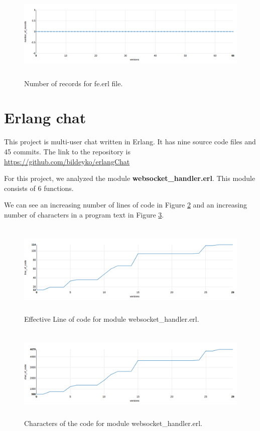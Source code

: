 \begin{figure}[h]
	\centering
	\includegraphics[height=45mm]{figures/number_of_records_iron.png}
	\caption{Number of records for fe.erl file.}
	\label{fig:number_of_records_iron}
\end{figure}

\section{Erlang chat }

This project is multi-user chat written in Erlang. It has nine source code files and 45 commits. The link to the repository is \url{https://github.com/bildeyko/erlangChat}

For this project, we analyzed the module \textbf{websocket\_handler.erl}. This module consists of 6 functions.

We can see an increasing number of lines of code in Figure \ref{fig:loc_chat} and an increasing number of characters in a program text in Figure \ref{fig:char_of_code_chat}.

\begin{figure}[h]
	\centering
	\includegraphics[height=45mm]{figures/loc_chat.png}
	\caption{Effective Line of code for module websocket\_handler.erl.}
	\label{fig:loc_chat}
\end{figure}

\begin{figure}[h]
	\centering
	\includegraphics[height=45mm]{figures/char_of_code_chat.png}
	\caption{Characters of the code for module websocket\_handler.erl.}
	\label{fig:char_of_code_chat}
\end{figure}

